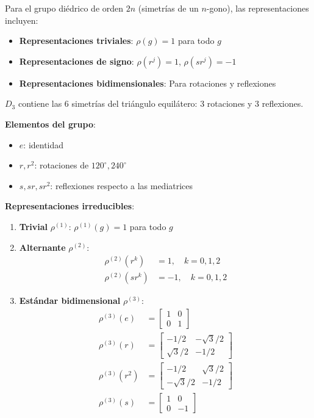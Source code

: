 \begin{example}\label{ex:grupo_diedrico_fourier}
Para el grupo diédrico de orden $2n$ (simetrías de un $n$-gono), las representaciones incluyen:
\begin{itemize}
    \item \textbf{Representaciones triviales}: $\rho(g) = 1$ para todo $g$
    \item \textbf{Representaciones de signo}: $\rho(r^j) = 1$, $\rho(sr^j) = -1$
    \item \textbf{Representaciones bidimensionales}: Para rotaciones y reflexiones
\end{itemize}
\end{example}

\begin{example}\label{ex:grupo_d3_detallado}
$D_3$ contiene las 6 simetrías del triángulo equilátero: 3 rotaciones y 3 reflexiones.

\textbf{Elementos del grupo}:
\begin{itemize}
    \item $e$: identidad
    \item $r, r^2$: rotaciones de $120^\circ, 240^\circ$
    \item $s, sr, sr^2$: reflexiones respecto a las mediatrices
\end{itemize}

\textbf{Representaciones irreducibles}:
\begin{enumerate}
    \item \textbf{Trivial} $\rho^{(1)}$: $\rho^{(1)}(g) = 1$ para todo $g$
    \item \textbf{Alternante} $\rho^{(2)}$:
    \begin{align}
    \rho^{(2)}(r^k) &= 1, \quad k = 0,1,2 \\
    \rho^{(2)}(sr^k) &= -1, \quad k = 0,1,2
    \end{align}
    \item \textbf{Estándar bidimensional} $\rho^{(3)}$:
    \begin{align}
    \rho^{(3)}(e) &= \begin{bmatrix} 1 & 0 \\ 0 & 1 \end{bmatrix} \\
    \rho^{(3)}(r) &= \begin{bmatrix} -1/2 & -\sqrt{3}/2 \\ \sqrt{3}/2 & -1/2 \end{bmatrix} \\
    \rho^{(3)}(r^2) &= \begin{bmatrix} -1/2 & \sqrt{3}/2 \\ -\sqrt{3}/2 & -1/2 \end{bmatrix} \\
    \rho^{(3)}(s) &= \begin{bmatrix} 1 & 0 \\ 0 & -1 \end{bmatrix}
    \end{align}
\end{enumerate}


\end{example}
